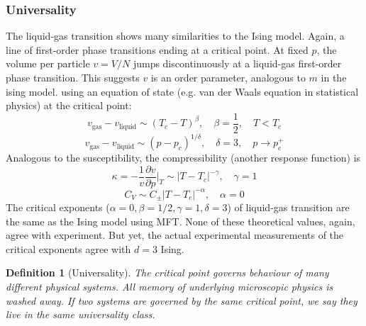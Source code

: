 \documentclass[a4paper]{article}
\theoremstyle{new}
\newtheorem{defi}{Definition}[section]
\begin{document}
\subsubsection{Universality}
The liquid-gas transition shows many similarities to the Ising model. Again, a line of first-order phase transitions ending at a critical point. At fixed $p$, the volume per particle $v=V/N$ jumps discontinuously at a liquid-gas first-order phase transition. This suggests $v$ is an order parameter, analogous to $m$ in the ising model. using an equation of state (e.g. van der Waals equation in statistical physics) at the critical point:
$$v_{\text{gas}}-v_{\text{liquid}}\sim(T_c-T)^\beta,\quad\beta=\frac{1}{2},\quad T<T_c$$
$$v_{\text{gas}}-v_{\text{liquid}}\sim(p-p_c)^{1/\delta},\quad\delta=3,\quad p\rightarrow p_c^+$$
Analogous to the susceptibility, the compressibility (another response function) is
$$\kappa=-\frac{1}{v}\frac{\partial v}{\partial p}\bigg|_T\sim|T-T_c|^{-\gamma},\quad\gamma=1$$
$$C_V\sim C_\pm|T-T_c|^{-\alpha},\quad\alpha=0$$
The critical exponents ($\alpha=0,\beta=1/2,\gamma=1,\delta=3$) of liquid-gas transition are the same as the Ising model using MFT. None of these theoretical values, again, agree with experiment. But yet, the actual experimental measurements of the critical exponents agree with $d=3$ Ising.
\begin{defi}[Universality]
The critical point governs behaviour of many different physical systems. All memory of underlying microscopic physics is washed away. If two systems are governed by the same critical point, we say they live in the same universality class.
\end{defi}
\newpage
\end{document}
